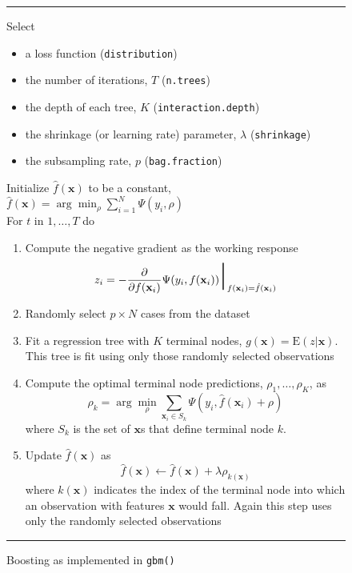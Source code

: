 \documentclass{article}
\newcommand{\EV}{\mathrm{E}}
\newcommand{\aRule}{\begin{center} \rule{5in}{1mm} \end{center}}
\begin{document}
\begin{figure}
\aRule
Select
\begin{itemize}
\item a loss function (\texttt{distribution})
\item the number of iterations, $T$ (\texttt{n.trees})
\item the depth of each tree, $K$ (\texttt{interaction.depth})
\item the shrinkage (or learning rate) parameter, $\lambda$ (\texttt{shrinkage})
\item the subsampling rate, $p$ (\texttt{bag.fraction})
\end{itemize}
Initialize $\hat f(\mathbf{x})$ to be a constant, $\hat f(\mathbf{x}) = \arg \min_{\rho} \sum_{i=1}^N \Psi(y_i,\rho)$ \\
For $t$ in $1,\ldots,T$ do
\begin{enumerate}
\item Compute the negative gradient as the working response
    \begin{equation}
    z_i = -\frac{\partial}{\partial f(\mathbf{x}_i)} \Psi(y_i,f(\mathbf{x}_i)) \mbox{\Huge $|$}_{f(\mathbf{x}_i)=\hat f(\mathbf{x}_i)}
    \end{equation}
\item Randomly select $p\times N$ cases from the dataset
\item Fit a regression tree with $K$ terminal nodes, $g(\mathbf{x})=\EV(z|\mathbf{x})$. This tree is fit using only those randomly selected observations
\item Compute the optimal terminal node predictions, $\rho_1,\ldots,\rho_K$, as
    \begin{equation}
    \rho_k = \arg \min_{\rho} \sum_{\mathbf{x}_i\in S_k} \Psi(y_i,\hat f(\mathbf{x}_i)+\rho)
    \end{equation}
where $S_k$ is the set of $\mathbf{x}$s that define terminal node $k$.
\item Update $\hat f(\mathbf{x})$ as
    \begin{equation}
    \hat f(\mathbf{x}) \leftarrow \hat f(\mathbf{x}) + \lambda\rho_{k(\mathbf{x})}
    \end{equation}
where $k(\mathbf{x})$ indicates the index of the terminal node into which an observation with features $\mathbf{x}$ would fall. Again this step uses only the randomly selected observations
\end{enumerate}
\aRule \caption{Boosting as implemented in \texttt{gbm()}}
\label{fig:gbm}
\end{figure}
\end{document}
